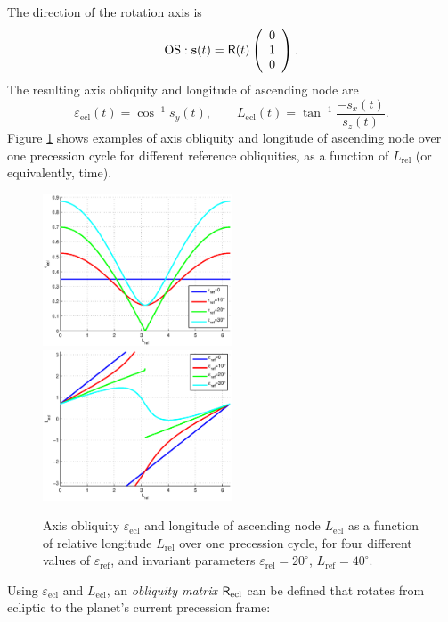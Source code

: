 \documentclass[Orbiter Technical Reference.tex]{subfiles}
\begin{document}
The direction of the rotation axis is
\begin{equation}
\mathrm{OS}: \mathbf{s}(t) = \mathsf{R}(t) \left(\begin{array}{c}
0 \\ 1 \\ 0 \end{array}\right).
\end{equation}
The resulting axis obliquity and longitude of ascending node are
\begin{equation}\label{eq:eps_ecl}
\varepsilon_\mathrm{ecl}(t) = \cos^{-1} s_y(t), \qquad
L_\mathrm{ecl}(t) = \tan^{-1} \frac{-s_x(t)}{s_z(t)}.
\end{equation}
Figure \ref{fig:plots} shows examples of axis obliquity and longitude of ascending node over one precession cycle for different reference obliquities, as a function of $L_\mathrm{rel}$ (or equivalently, time).
\begin{figure}
\includegraphics[width=0.5\textwidth]{fig3a.eps}
\includegraphics[width=0.5\textwidth]{fig3b.eps}
\caption{Axis obliquity $\varepsilon_\mathrm{ecl}$ and longitude of ascending node $L_\mathrm{ecl}$ as a function of relative longitude $L_\mathrm{rel}$ over one precession cycle, for four different values of $\varepsilon_\mathrm{ref}$, and invariant parameters $\varepsilon_\mathrm{rel} = 20^\circ$, $L_\mathrm{ref}=40^\circ$.}
\label{fig:plots}
\end{figure}
Using $\varepsilon_\mathrm{ecl}$ and $L_\mathrm{ecl}$, an \emph{obliquity matrix} $\mathsf{R}_\mathrm{ecl}$ can be defined that rotates from ecliptic to the planet's current precession frame:
\end{document}
